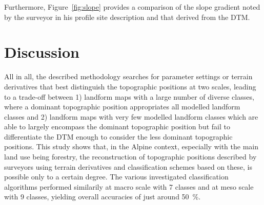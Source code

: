 \documentclass[preprint,12pt,authoryear]{elsarticle}
\begin{document}
 Furthermore, Figure~\ref{fig:slope} provides a comparison of the slope gradient noted by the surveyor in his profile site description and that derived from the DTM.




\section{Discussion}
All in all, the described methodology searches for parameter settings or terrain derivatives that best distinguish the topographic positions at two scales, leading to a trade-off between 1) landform maps with a large number of diverse classes, where a dominant topographic position appropriates all modelled landform classes and 2) landform maps with very few modelled landform classes which are able to largely encompass the dominant topographic position but fail to differentiate the DTM enough to consider the less dominant topographic positions.
This study shows that, in the Alpine context, especially with the main land use being forestry, the reconstruction of topographic positions described by surveyors using terrain derivatives and classification schemes based on these, is possible only to a certain degree. The various investigated classification algorithms performed similarily at macro scale with 7 classes and at meso scale with 9 classes, yielding overall accuracies of just around 50~\%.
\end{document}
